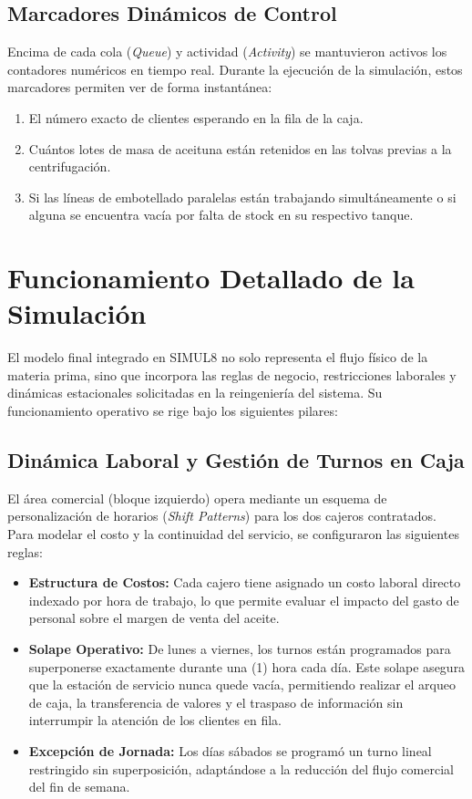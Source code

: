 \documentclass[runningheads]{llncs}
\begin{document}
\subsection{Marcadores Dinámicos de Control}
Encima de cada cola (\textit{Queue}) y actividad (\textit{Activity}) se mantuvieron activos los contadores numéricos en tiempo real. Durante la ejecución de la simulación, estos marcadores permiten ver de forma instantánea:
\begin{enumerate}
    \item El número exacto de clientes esperando en la fila de la caja.
    \item Cuántos lotes de masa de aceituna están retenidos en las tolvas previas a la centrifugación.
    \item Si las líneas de embotellado paralelas están trabajando simultáneamente o si alguna se encuentra vacía por falta de stock en su respectivo tanque.
\end{enumerate}


\section{Funcionamiento Detallado de la Simulación}

El modelo final integrado en SIMUL8 no solo representa el flujo físico de la materia prima, sino que incorpora las reglas de negocio, restricciones laborales y dinámicas estacionales solicitadas en la reingeniería del sistema. Su funcionamiento operativo se rige bajo los siguientes pilares:

\subsection{Dinámica Laboral y Gestión de Turnos en Caja}
El área comercial (bloque izquierdo) opera mediante un esquema de personalización de horarios (\textit{Shift Patterns}) para los dos cajeros contratados. Para modelar el costo y la continuidad del servicio, se configuraron las siguientes reglas:
\begin{itemize}
    \item \textbf{Estructura de Costos:} Cada cajero tiene asignado un costo laboral directo indexado por hora de trabajo, lo que permite evaluar el impacto del gasto de personal sobre el margen de venta del aceite.
    \item \textbf{Solape Operativo:} De lunes a viernes, los turnos están programados para superponerse exactamente durante una (1) hora cada día. Este solape asegura que la estación de servicio nunca quede vacía, permitiendo realizar el arqueo de caja, la transferencia de valores y el traspaso de información sin interrumpir la atención de los clientes en fila.
    \item \textbf{Excepción de Jornada:} Los días sábados se programó un turno lineal restringido sin superposición, adaptándose a la reducción del flujo comercial del fin de semana.
\end{itemize}
\end{document}
